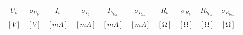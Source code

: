 \begin{tabular}{cccccccccc}                                                                                                                   \toprule
$U_b$      & $\sigma_{U_b}$  & $I_b$       & $\sigma_{I_b}$ & $I_{b_{kor}}$ & $\sigma_{I_{b_{kor}}}$ & $R_b$         & $\sigma_{R_b}$ & $R_{b_{kor}}$ & $\sigma_{R_{b_{kor}}}$   \\
$[\si{V}]$ & $[\si{V}]$      & $[\si{mA}]$ & $[\si{mA}]$    & $[\si{mA}]$   & $[\si{mA}]$            & $[\si{\ohm}]$ & $[\si{\ohm}]$  & $[\si{\ohm}]$ & $[\si{\ohm}]$            \\  \midrule
                                                                                                                                                                                             

\end{tabular}
